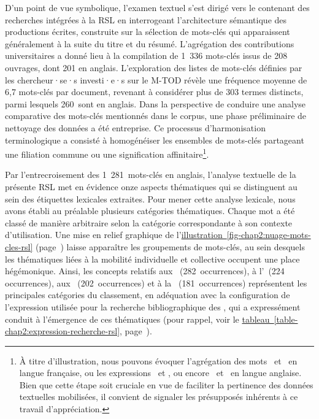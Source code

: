 \begin{refsegment}
D'un point de vue symbolique, l'examen textuel s'est dirigé vers le contenant des recherches intégrées à la \acrshort{RSL} en interrogeant l'architecture sémantique des productions écrites, construite sur la sélection de mots-clés qui apparaissent généralement à la suite du titre et du résumé. L'agrégation des contributions universitaires a donné lieu à la compilation de 1~336 mots-clés issus de 208 ouvrages, dont 201 en anglais. L'exploration des listes de mots-clés définies par les chercheur·se·s investi·e·s sur le \acrshort{M-TOD} révèle une fréquence moyenne de 6,7 mots-clés par document, revenant à considérer plus de 303 termes distincts, parmi lesquels 260~sont en anglais. Dans la perspective de conduire une analyse comparative des mots-clés mentionnés dans le corpus, une phase préliminaire de nettoyage des données a été entreprise. Ce processus d'harmonisation terminologique a consisté à homogénéiser les ensembles de mots-clés partageant une filiation commune ou une signification affinitaire\footnote{
    À titre d'illustration, nous pouvons évoquer l'agrégation des mots ~et ~en langue française, ou les expressions ~et , ou encore ~et ~en langue anglaise. Bien que cette étape soit cruciale en vue de faciliter la pertinence des données textuelles mobilisées, il convient de signaler les présupposés inhérents à ce travail d'appréciation.
}.%

Par l'entrecroisement des 1~281~mots-clés en anglais, l'analyse textuelle de la présente \acrshort{RSL} met en évidence onze aspects thématiques qui se distinguent au sein des étiquettes lexicales extraites. Pour mener cette analyse lexicale, nous avons établi au préalable plusieurs catégories thématiques. Chaque mot a été classé de manière arbitraire selon la catégorie correspondante à son contexte d'utilisation. Une mise en relief graphique de l'\hyperref[fig-chap2:nuage-mots-cles-rsl]{illustration~\ref{fig-chap2:nuage-mots-cles-rsl}} (page~\pageref{fig-chap2:nuage-mots-cles-rsl}) laisse apparaître les groupements de mots-clés, au sein desquels les thématiques liées à la mobilité individuelle et collective occupent une place hégémonique. Ainsi, les concepts relatifs aux ~(282~occurrences), à l’~(224 occurrences), aux ~(202~occurrences) et à la ~(181~occurrences) représentent les principales catégories du classement, en adéquation avec la configuration de l'expression utilisée pour la recherche bibliographique des , qui a expressément conduit à l'émergence de ces thématiques (pour rappel, voir le \hyperref[table-chap2:expression-recherche-rsl]{tableau~\ref{table-chap2:expression-recherche-rsl}}, page~\pageref{table-chap2:expression-recherche-rsl}).%


\end{refsegment}
